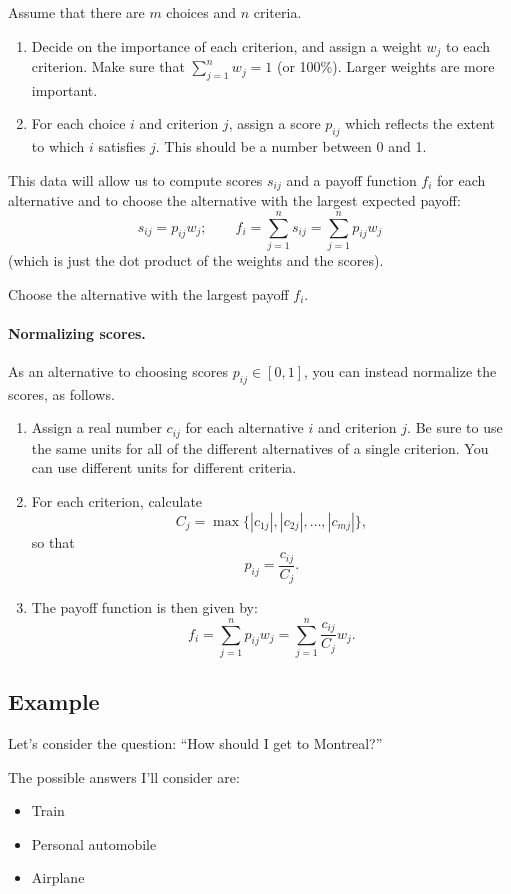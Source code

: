 Assume that there are $m$ choices and $n$ criteria. 
\begin{enumerate}
\item Decide on the importance of each criterion, and assign a weight
  $w_j$ to each criterion. Make sure that $\sum_{j=1}^n w_j = 1$ (or
  100\%). Larger weights are more important.
\item For each choice $i$ and criterion $j$, assign a score $p_{ij}$
  which reflects the extent to which $i$ satisfies $j$. This should be
  a number between 0 and 1.
\end{enumerate}
This data will allow us to compute scores $s_{ij}$ and a payoff
function $f_i$ for each alternative and to choose the alternative with
the largest expected payoff:
\[ s_{ij} = p_{ij} w_j; \qquad f_i = \sum_{j=1}^n s_{ij} = \sum_{j=1}^n p_{ij} w_j \]
(which is just the dot product of the weights and the scores).

Choose the alternative with the largest payoff $f_i$.

\paragraph{Normalizing scores.} As an alternative to choosing scores
$p_{ij} \in [0, 1]$, you can instead normalize the scores,
as follows.
\begin{enumerate}
\item Assign a real number $c_{ij}$ for each alternative $i$ and criterion $j$.
Be sure to use the same units for all of the different alternatives of a 
single criterion. You can use different units for different criteria.
\item For each criterion, calculate
\[ C_j = \max \{ |c_{1j}|, |c_{2j}|, \ldots, |c_{mj}| \}, \]
so that
\[ p_{ij} = \frac{c_{ij}}{C_j}. \]
\item The payoff function is then given by:
\[ f_i = \sum_{j=1}^n p_{ij} w_j = \sum_{j=1}^n \frac{c_{ij}}{C_j}  w_j. \]
\end{enumerate}

\subsection*{Example}
Let's consider the question: ``How should I get to Montreal?''

The possible answers I'll consider are:
\begin{itemize}
\item Train
\item Personal automobile
\item Airplane
\end{itemize}

